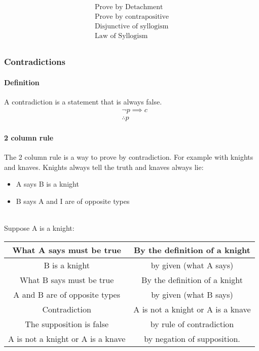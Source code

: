 \begin{align*}
    \text{Prove by Detachment} \\
    \text{Prove by contrapositive}\\
    \text{Disjunctive of syllogism}\\
    \text{Law of Syllogism}\\
\end{align*}

\subsubsection*{Contradictions}
\paragraph*{Definition}
A contradiction is a statement that is always false.
\begin{align*}
    &\neg p \implies c\\
    &\therefore p
\end{align*}
\pagebreak
\paragraph*{2 column rule}
The 2 column rule is a way to prove by contradiction. For example with knights and knaves. Knights always
tell the truth and knaves always lie:
\begin{itemize}
    \item A says B is a knight
    \item B says A and I are of opposite types
\end{itemize}

\hrulefill\\

Suppose A is a knight:
\begin{center}
    \begin{tabular}{c|c}
    \hline
    What A says must be true & By the definition of a knight\\
    \hline
    B is a knight & by given (what A says)\\
    \hline
    What B says must be true & By the definition of a knight\\
    \hline
    A and B are of opposite types & by given (what B says)\\
    \hline
    Contradiction & A is not a knight or A is a knave\\
    \hline
    The supposition is false & by rule of contradiction\\
    \hline
    A is not a knight or A is a knave & by negation of supposition.\\
    \hline
    \end{tabular}
\end{center}